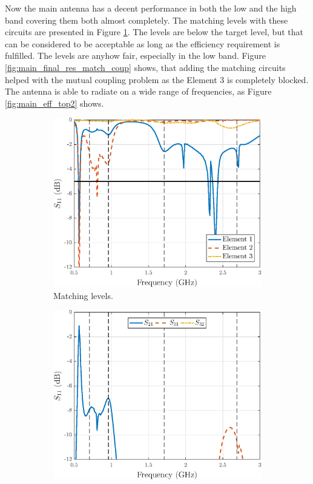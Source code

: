 Now the main antenna has a decent performance in both the low and the high band covering them both almost completely. The matching levels with these circuits are presented in Figure \ref{fig:main_final_res_match}. The levels are below the target level, but that can be considered to be acceptable as long as the efficiency requirement is fulfilled. The levels are anyhow fair, especially in the low band. Figure \ref{fig:main_final_res_match_coup} shows, that adding the matching circuits helped with the mutual coupling problem as the Element 3 is completely blocked. The antenna is able to radiate on a wide range of frequencies, as Figure \ref{fig:main_eff_top2} shows.  
\begin{figure}[H]
    \centering
    \begin{subfigure}[b]{0.49\textwidth}
        \includegraphics[width=\textwidth]{img/main_final_res_match.eps}
        \caption{Matching levels.}
        \label{fig:main_final_res_match}
    \end{subfigure}
    \begin{subfigure}[b]{0.49\textwidth}
        \includegraphics[width=\textwidth]{img/main_final_res_match_coup.eps}

\end{subfigure}
\end{figure}
